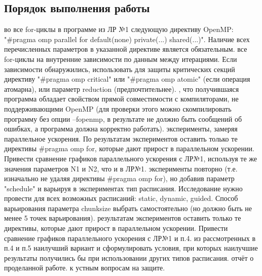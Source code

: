 { %
	\subsection{Порядок выполнения работы}
	\begin{enumerate}
		 во все for-циклы в программе из ЛР №1 следующую директиву OpenMP: \\	
"\#pragma omp parallel for default(none) private(...) shared(...)". Наличие всех перечисленных параметров в указанной директиве является обязательным.
		 все for-циклы на внутренние зависимости по данным между итерациями. Если зависимости обнаружились, использовать для защиты критических секций директиву "\#pragma omp critical" или "\#pragma omp atomic" (если операция атомарна), или параметр reduction (предпочтительнее).
		, что получившаяся программа обладает свойством прямой совместимости с компиляторами, не поддерживающими OpenMP (для проверки этого можно скомпилировать программу без опции –fopenmp, в результате не должно быть сообщений об ошибках, а программа должна корректно работать).
		 эксперименты, замеряя параллельное ускорения. По результатам экспериментов оставить только те директивы \#pragma omp for, которые дают прирост в параллельном ускорении. Привести сравнение графиков параллельного ускорения с ЛР№1, используя те же значения параметров N1 и N2, что и в ЛР№1. 
		 эксперименты повторно (т.е. изначально не удаляя директивы \#pragma omp for), но добавив параметр "schedule" и варьируя в экспериментах тип расписания. Исследование нужно провести для всех возможных расписаний: static, dynamic, guided. Способ варьирования параметра chunk\textunderscore size выбрать самостоятельно (но должно быть не менее 5 точек варьирования).
		 результатам экспериментов оставить только те директивы, которые дают прирост в параллельном ускорении. Привести сравнение графиков параллельного ускорения с ЛР№1 и п.4. 
		 из рассмотренных в п.4 и п.5 наилучший вариант и сформулировать условия, при которых наилучшие результаты получились бы при использовании других типов расписания.
		 отчёт о проделанной работе.
		 к устным вопросам на защите.
	\end{enumerate}
}